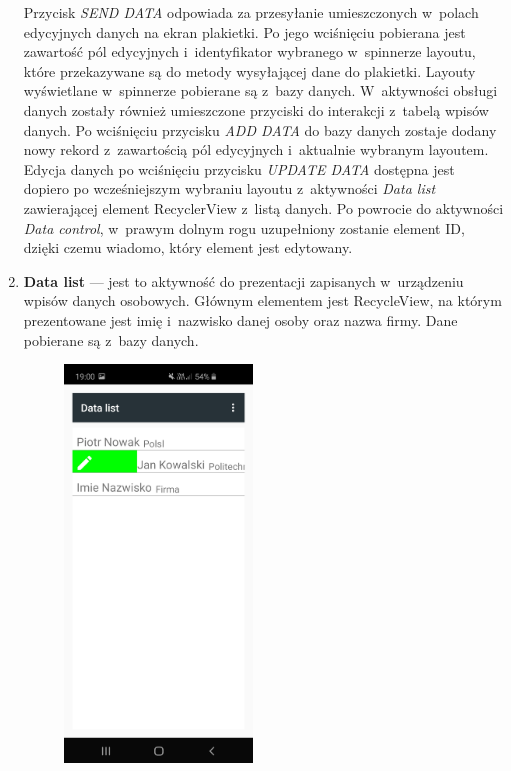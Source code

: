 \documentclass[a4paper,12pt, twoside]{article}
\begin{document}
\begin{enumerate}
\begin{figure}[H]
\begin{minipage}{.5\textwidth}
                \end{minipage}
    	   \end{figure}
    	   Przycisk \textit{SEND DATA} odpowiada za przesyłanie umieszczonych w~polach edycyjnych danych na ekran plakietki. Po jego wciśnięciu pobierana jest zawartość pól edycyjnych i~identyfikator wybranego w~spinnerze layoutu, które przekazywane są do metody wysyłającej dane do plakietki. Layouty wyświetlane w~spinnerze pobierane są z~bazy danych. W~aktywności obsługi danych zostały również umieszczone przyciski do interakcji z~tabelą wpisów danych. Po wciśnięciu przycisku \textit{ADD DATA} do bazy danych zostaje dodany nowy rekord z~zawartością pól edycyjnych i~aktualnie wybranym layoutem. Edycja danych po wciśnięciu przycisku \textit{UPDATE DATA} dostępna jest dopiero po wcześniejszym wybraniu layoutu z~aktywności \textit{Data list} zawierającej element RecyclerView z~listą danych. Po powrocie do aktywności \textit{Data control}, w~prawym dolnym rogu uzupełniony zostanie element ID, dzięki czemu wiadomo, który element jest edytowany.
    	   \item \textbf{Data list} — jest to aktywność do prezentacji zapisanych w~urządzeniu wpisów danych osobowych. Głównym elementem jest RecycleView, na którym prezentowane jest imię i~nazwisko danej osoby oraz nazwa firmy. Dane pobierane są z~bazy danych.  
    	   \begin{figure}[H]
    	        \centering
    	        \begin{minipage}{.5\textwidth}
                    \centering
    	            \includegraphics[width=5cm]{images/view_dataList.jpg}

\end{minipage}
\end{figure}
\end{enumerate}
\end{document}
